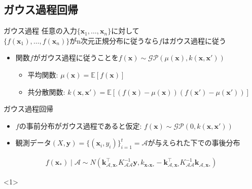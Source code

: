 \documentclass[dvipdfmx, 10.5pt]{beamer}
\begin{document}
\subsection{ガウス過程回帰}
\begin{frame}{\insertsubsection}
	\begin{block}{ガウス過程}
		任意の入力$\{ \bm x_1, \ldots, \bm x_n \}$に対して\\
		$\{f(\bm x_1), \ldots, f(\bm x_n)\}$がn次元正規分布に従うなら$f$はガウス過程に従う
	\end{block}

\begin{itemize}
	\item 関数$f$がガウス過程に従うことを$f(\bm x) \sim \mathcal{GP}(\mu(\bm x), k(\bm x, \bm x'))$
	\begin{itemize}
		\item 平均関数: $\mu(\bm x) = \mathbb{E}[f(\bm x)]$
		\vspace{1pt}
		\item 共分散関数: $k(\bm x, \bm x') = \mathbb{E}[(f(\bm x) - \mu(\bm x))(f(\bm x') - \mu(\bm x'))]$
	\end{itemize}
	\end{itemize}
\begin{block}{ガウス過程回帰}
	\begin{itemize}
		\item $f$の事前分布がガウス過程であると仮定: $f(\bm x) \sim \mathcal{GP}( 0, k(\bm x, \bm x'))$
		\item 観測データ$(X, \bm y) = \{(\bm x_i, y_i)\}_{i = 1}^t = \mathcal{A}$が与えられた下での事後分布
	\end{itemize}
	\vspace{-0.2cm}
	\begin{align*}
		f({\bm x}_\ast) \mid \mathcal{A}
			\sim
			N \left(
			\bm k_{\mathcal{A}, {\bm x}_\ast   }^\top
			K_{\mathcal{A} \mathcal{A}}^{-1}
			{\bm y},%
			k_{{\bm x}_\ast {\bm x}_\ast}
			-
			\bm k_{\mathcal{A} , {\bm x}_\ast}^\top
			K_{\mathcal{A} \mathcal{A}}^{-1}
			\bm k_{\mathcal{A} , {\bm x}_\ast}%
			\right)
	\end{align*}
	\vspace{-1cm}

	\begin{onlyenv}


\end{onlyenv}
\end{block}
\end{frame}
\end{document}
